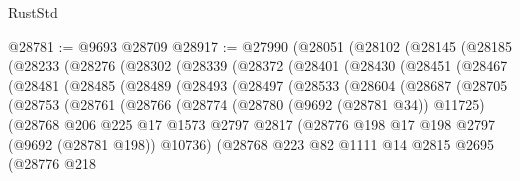 \begin{lexlean}{RustStd}
\begin{coremodule}
@28781 := @9693 @28709
@28917 := @27990
    (@28051
      (@28102
        (@28145
          (@28185
            (@28233
              (@28276
                (@28302
                  (@28339
                    (@28372
                      (@28401
                        (@28430
                          (@28451
                            (@28467
                              (@28481
                                (@28485
                                  (@28489
                                    (@28493
                                      (@28497
                                        (@28533
                                          (@28604
                                            (@28687
                                              (@28705
                                                (@28753
                                                  (@28761
                                                    (@28766
                                                      (@28774
                                                        (@28780 (@9692 (@28781 @34)) @11725)
                                                        (@28768
                                                          @206
                                                          @225
                                                          @17
                                                          @1573
                                                          @2797
                                                          @2817
                                                          (@28776
                                                            @198
                                                            @17
                                                            @198
                                                            @2797
                                                            (@9692 (@28781 @198))
                                                            @10736)
                                                          (@28768
                                                            @223
                                                            @82
                                                            @1111
                                                            @14
                                                            @2815
                                                            @2695
                                                            (@28776
                                                              @218

\end{coremodule}
\end{lexlean}
